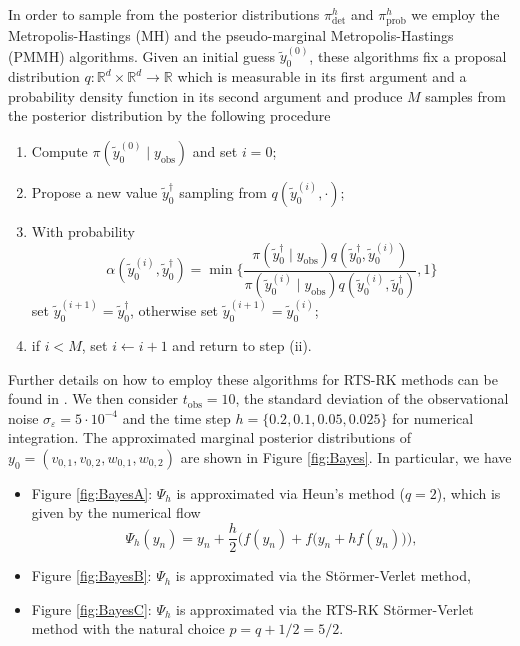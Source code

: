 \documentclass{siamart1116}
\numberwithin{theorem}{section}
\newcommand{\R}{\mathbb{R}}
\newcommand{\epl}{\varepsilon}
\begin{document}
In order to sample from the posterior distributions $\pi^h_{\mathrm{det}}$ and $\pi^h_{\mathrm{prob}}$ we employ the Metropolis-Hastings (MH) and the pseudo-marginal Metropolis-Hastings (PMMH) algorithms. Given an initial guess $\tilde y_0^{(0)}$, these algorithms fix a proposal distribution $q \colon \R^d\times \R^d \to \R$ which is measurable in its first argument and a probability density function in its second argument and produce $M$ samples from the posterior distribution by the following procedure
\begin{enumerate}
	\item Compute $\pi(\tilde y_0^{(0)} \mid y_{\mathrm{obs}})$ and set $i = 0$;
	\item Propose a new value $\tilde y_0^{\dagger}$ sampling from $q(\tilde y_0^{(i)}, \cdot)$;
	\item With probability 
	\begin{equation}
		\alpha(\tilde y_0^{(i)}, \tilde y_0^{\dagger}) = \min\Big\{ \frac{\pi(\tilde y_0^\dagger \mid y_{\mathrm{obs}}) q(\tilde y_0^{\dagger}, \tilde y_0^{(i)})}
		{\pi(\tilde y_0^{(i)} \mid y_{\mathrm{obs}}) q(\tilde y_0^{(i)}, \tilde y_0^{\dagger})} , 1\Big\}
	\end{equation}
	set $\tilde y_0^{(i+1)} = \tilde y_0^{\dagger}$, otherwise set $\tilde y_0^{(i+1)} = \tilde y_0^{(i)}$;
	\item if $i < M$, set $i \leftarrow i + 1$ and return to step (ii).
\end{enumerate}
Further details on how to employ these algorithms for RTS-RK methods can be found in \cite{AbG18}. We then consider $t_{\mathrm{obs}} = 10$, the standard deviation of the observational noise $\sigma_\epl = 5 \cdot 10^{-4}$ and the time step $h = \{0.2, 0.1, 0.05, 0.025\}$ for numerical integration. The approximated marginal posterior distributions of $ y_0 = (v_{0,1}, v_{0, 2}, w_{0, 1}, w_{0, 2})$ are shown in Figure \ref{fig:Bayes}. In particular, we have
\begin{itemize}[label = -]
	\item Figure \ref{fig:BayesA}: $\Psi_h$ is approximated via Heun's method \cite{Heu00} ($q = 2$), which is given by the numerical flow 
	\begin{equation*}
		\Psi_h(y_n) = y_n + \frac{h}{2}\Big(f(y_n) + f\big(y_n + hf(y_n)\big)\Big),
	\end{equation*}
	\item Figure \ref{fig:BayesB}: $\Psi_h$ is approximated via the Störmer-Verlet method,
	\item Figure \ref{fig:BayesC}: $\Psi_h$ is approximated via the RTS-RK Störmer-Verlet method with the natural choice $p = q+1/2 = 5/2$.
\end{itemize}
\end{document}
